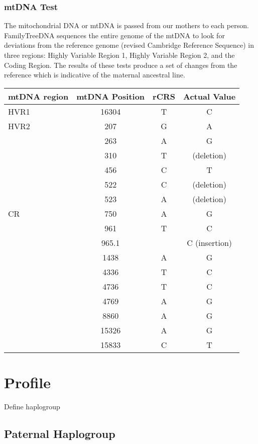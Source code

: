 \documentclass[11pt,letter]{book}
\begin{document}
\subsection{mtDNA Test}

The mitochondrial DNA or mtDNA is passed from our mothers to each person.  FamilyTreeDNA sequences the entire genome of the mtDNA to look for deviations from the reference genome (revised Cambridge Reference Sequence) in three regions: Highly Variable Region 1, Highly Variable Region 2, and the Coding Region.  The results of these tests produce a set of changes from the reference which is indicative of the maternal ancestral line.

\begin{center}
\begin{tabular}{l | c | c | c}
	mtDNA region & mtDNA Position & rCRS & Actual Value \\
	\hline
	 HVR1 & 16304 & T & C \\
	 HVR2 & 207 & G & A \\
	 & 263 & A & G \\
	 & 310 & T & (deletion) \\
	 & 456 & C & T \\
	 & 522 & C & (deletion) \\
	 & 523 & A & (deletion) \\
	 CR & 750 & A & G \\
	 & 961 & T & C \\
	 & 965.1 & & C (insertion) \\
	 & 1438 & A & G \\
	 & 4336 & T & C \\
	 & 4736 & T & C \\
	 & 4769 & A & G \\
	 & 8860 & A & G \\
	 & 15326 & A & G \\
	 & 15833 & C & T \\
\end{tabular}
\end{center}

\chapter{Profile}

Define haplogroup

\section{Paternal Haplogroup}
\end{document}
